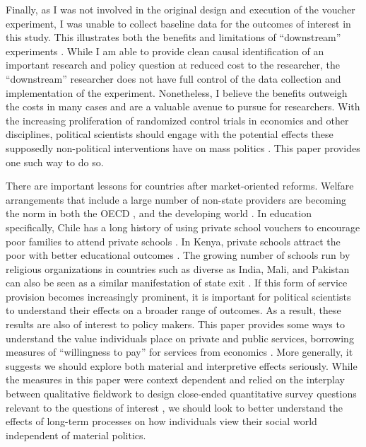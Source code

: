 \documentclass[hidelinks, 12pt, titlepage]{article}
\begin{document}
	Finally, as I was not involved in the original design and execution of the voucher experiment, I was unable to collect baseline data for the outcomes of interest in this study.  This illustrates both the benefits and limitations of ``downstream'' experiments \citep{Baldwin2011}.  While I am able to provide clean causal identification of an important research and policy question at reduced cost to the researcher, the ``downstream'' researcher does not have full control of the data collection and implementation of the experiment.  Nonetheless, I believe the benefits outweigh the costs in many cases and are a valuable avenue to pursue for researchers.  With the increasing proliferation of randomized control trials in economics and other disciplines, political scientists should engage with the potential effects these supposedly non-political interventions have on mass politics \citep{Humphreys2020}.  This paper provides one such way to do so.

	There are important lessons for countries after market-oriented reforms.  Welfare arrangements that include a large number of non-state providers are becoming the norm in both the OECD \citep{Gingrich2011}, and the developing world \citep{Thachil2009, Cammett2011}.  In education specifically, Chile has a long history of using private school vouchers to encourage poor families to attend private schools \citep{Hsieh2006}.  In Kenya, private schools attract the poor with better educational outcomes \citep{Bold2015, Duflo2015a}.  The growing number of schools run by religious organizations in countries such as diverse as India, Mali, and Pakistan can also be seen as a similar manifestation of state exit \citep{Andrabi2006, Bleck2015,Thachil2011}.  If this form of service provision becomes increasingly prominent, it is important for political scientists to understand their effects on a broader range of outcomes.  As a result, these results are also of interest to policy makers.  This paper provides some ways to understand the value individuals place on private and public services, borrowing measures of ``willingness to pay'' for services from economics \citep{Cohen2010}.  More generally, it suggests we should explore both material and interpretive effects seriously.  While the measures in this paper were context dependent and relied on the interplay between qualitative fieldwork to design close-ended quantitative survey questions relevant to the questions of interest \citep{Thachil2017}, we should look to better understand the effects of long-term processes on how individuals view their social world independent of material politics.
\end{document}
